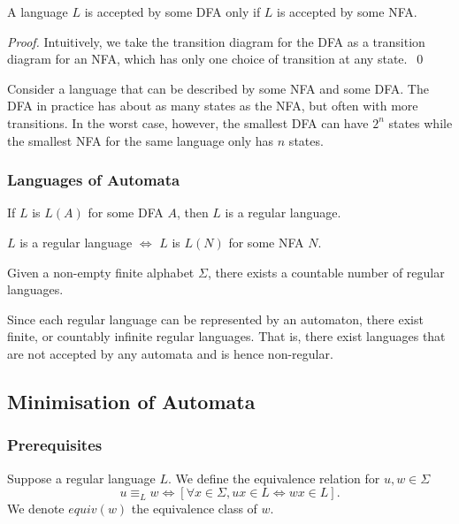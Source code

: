\begin{theorem}
  A language $L$ is accepted by some DFA only if $L$ is accepted by some NFA\@.
\end{theorem}
\begin{proof}
  Intuitively, we take the transition diagram for the DFA as a transition diagram
  for an NFA, which has only one choice of transition at any state.\ \qed%
\end{proof}

Consider a language that can be described by some NFA and some DFA\@. The DFA in
practice has about as many states as the NFA, but often with more transitions.
In the worst case, however, the smallest DFA can have $2^{n}$ states while the
smallest NFA for the same language only has $n$ states.

\subsubsection{Languages of Automata}
\begin{definition}
  If $L$ is $L(A)$ for some DFA $A$, then $L$ is a regular language.
\end{definition}
\begin{corollary}
  $L$ is a regular language $\iff$ $L$ is $L(N)$ for some NFA $N$.
\end{corollary}

\begin{theorem}
  Given a non-empty finite alphabet $\Sigma$, there exists a countable number of regular languages.
\end{theorem}
Since each regular language can be represented by an automaton, there exist
finite, or countably infinite regular languages. That is, there exist
languages that are not accepted by any automata and is hence non-regular.

\subsection{Minimisation of Automata}\label{minimisation}

\subsubsection{Prerequisites}
Suppose a regular language $L$. We define the equivalence relation for $u,w\in \Sigma$
\[u \equiv_L w\iff \left[ \forall x\in \Sigma, ux\in L \iff wx\in L \right].\]
We denote $equiv(w)$ the equivalence class of $w$.

